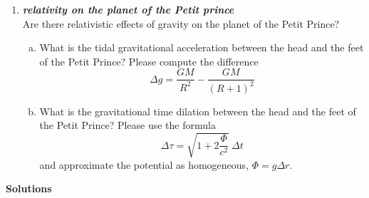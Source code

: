 \documentclass[a4paper,12pt]{article}
\newcommand{\question}[1]{\textbf{\textit{#1}}}
\begin{document}
\begin{enumerate}
\item \question{relativity on the planet of the Petit prince}\\
Are there relativistic effects of gravity on the planet of the Petit Prince?
\begin{enumerate}[(a)]
\item{What is the tidal gravitational acceleration between the head
    and the feet of the Petit Prince? Please compute the difference
\begin{equation}
\Delta g = \frac{GM}{R^2}-\frac{GM}{(R+1)^2} 
\end{equation}
}
\item{What is the gravitational time dilation between the head and the feet of the Petit Prince? Please use the formula
\begin{equation}
\Delta \tau = \sqrt{1+2\frac{\Phi}{c^2}}\:\Delta t
\end{equation}
and approximate the potential as homogeneous, $\Phi = g\Delta r$.
}
\end{enumerate}
\end{enumerate}
\newpage

{\bf Solutions}
\\
\end{document}

